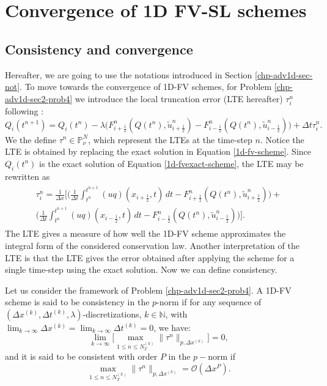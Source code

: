 \section{Convergence of 1D FV-SL schemes}
\label{convergence-1dfvsl}
\subsection{Consistency and convergence}
\label{chp-adv1d-sub-CC}
Hereafter, we are going to use the notations introduced in Section \ref{chp-adv1d-sec-not}.
To move towards the convergence of 1D-FV schemes, for  Problem \ref{chp-adv1d-sec2-prob4} we introduce the local truncation error (LTE hereafter)
$\tau_i^n$ following \citet{leveque:2002}:
\begin{equation}
	\label{consistency-1d-eq1}
	Q_i(t^{n+1}) = Q_i(t^n) - \lambda
	\bigg({F}^n_{i+\frac{1}{2}}(Q(t^n),\tilde{u}^n_{i+\frac{1}{2}})-
	{F}^n_{i-\frac{1}{2}}(Q(t^n),\tilde{u}^n_{i-\frac{1}{2}}) \bigg) + \Delta t \tau_i^n.
\end{equation}
We the define $\tau^n \in \mathbb{P}^{N}_{\nu}$, which represent the LTEs at the time-step $n$.
Notice the LTE is obtained by replacing the exact solution in Equation \eqref{1d-fv-scheme}.
Since $Q_i(t^n)$ is the exact solution of Equation \eqref{1d-fvexact-scheme}, 
the LTE may be rewritten as
\begin{align}
	\begin{split}
		\label{consistency-1d-eq2}
		\tau_{i}^n = 
		\frac{1}{\Delta x} \bigg[  \bigg( \frac{1}{\Delta t}\int_{t^{n}}^{t^{n+1}}
		{(uq)}(x_{i+\frac{1}{2}}, t) \,dt - {F}^n_{i+\frac{1}{2}}(Q(t^n),\tilde{u}^n_{i+\frac{1}{2}}) \bigg) +\\
		\bigg( \frac{1}{\Delta t}\int_{t^{n}}^{t^{n+1}}
		{(uq)}(x_{i-\frac{1}{2}}, t) \,dt - {F}^n_{i-\frac{1}{2}}(Q(t^n),\tilde{u}^n_{i-\frac{1}{2}}) \bigg)
		\bigg].
	\end{split}
\end{align}
The LTE gives a measure of how well the 1D-FV scheme approximates the integral form
of the considered conservation law. 
Another interpretation of the LTE is that the LTE gives the error obtained after applying
the scheme for a single time-step using the exact solution.
Now we can define consistency.
\begin{definition}[Consistency]
	\label{chp-adv1d-def-cons}
	Let us consider the framework of Problem \ref{chp-adv1d-sec2-prob4}.
	A 1D-FV scheme is said to be consistency in the $p$-norm if for any sequence of $(\Delta x^{(k)}, \Delta t^{(k)},\lambda)$-discretizations, 
	$k \in \mathbb{N}$, with $\lim_{k\to \infty }{\Delta x^{(k)}} = \lim_{k\to \infty }{\Delta t^{(k)}} = 0$, we have:
	\begin{equation*}
		\lim_{k \to \infty}\bigg[ {\max_{1\leq n\leq N_T^{(k)}}}{\|\tau^n\|_{p,\Delta x^{(k)}}} \bigg] = 0,
	\end{equation*}
	and it is said to be consistent with order $P$ in the $p-$norm if %
	\begin{equation*}
		{\max_{1\leq n\leq N_T^{(k)}}}{\|\tau^n\|_{p,\Delta x^{(k)}}} = \mathcal{O}(\Delta x^P).
	\end{equation*}
\end{definition}
